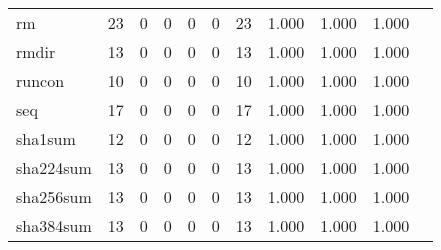 \begin{longtable}{lp{1.10cm}p{1.10cm}p{1.10cm}p{1.10cm}p{1.10cm}p{1.10cm}p{1.10cm}p{1.10cm}p{1.10cm}p{1.10cm}}
rm        &                     23 &                                  0 &                                 0 &                                0 &                                 0 &                              23 &                          1.000 &                                 1.000 &                               1.000 \\
rmdir     &                     13 &                                  0 &                                 0 &                                0 &                                 0 &                              13 &                          1.000 &                                 1.000 &                               1.000 \\
runcon    &                     10 &                                  0 &                                 0 &                                0 &                                 0 &                              10 &                          1.000 &                                 1.000 &                               1.000 \\
seq       &                     17 &                                  0 &                                 0 &                                0 &                                 0 &                              17 &                          1.000 &                                 1.000 &                               1.000 \\
sha1sum   &                     12 &                                  0 &                                 0 &                                0 &                                 0 &                              12 &                          1.000 &                                 1.000 &                               1.000 \\
sha224sum &                     13 &                                  0 &                                 0 &                                0 &                                 0 &                              13 &                          1.000 &                                 1.000 &                               1.000 \\
sha256sum &                     13 &                                  0 &                                 0 &                                0 &                                 0 &                              13 &                          1.000 &                                 1.000 &                               1.000 \\
sha384sum &                     13 &                                  0 &                                 0 &                                0 &                                 0 &                              13 &                          1.000 &                                 1.000 &                               1.000 \\

\end{longtable}

